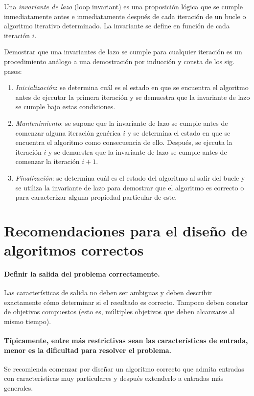 Una \emph{invariante de lazo} (loop invariant) es una proposición lógica que se cumple inmediatamente antes e inmediatamente después de cada iteración de un bucle o algoritmo iterativo determinado. 
La invariante se define en función de cada iteración \(i\).

Demostrar que una invariantes de lazo se cumple para cualquier iteración es un procedimiento análogo a una demostración por inducción y consta de los sig. pasos: 
\begin{enumerate}
  \item \emph{Inicialización}: se determina cuál es el estado en que se encuentra el algoritmo antes de ejecutar la primera iteración y se demuestra que la invariante de lazo se cumple bajo estas condiciones.
  \item \emph{Mantenimiento}: se supone que la invariante de lazo se cumple antes de comenzar alguna iteración genérica \(i\) y se determina el estado en que se encuentra el algoritmo como consecuencia de ello. 
  Después, se ejecuta la iteración \(i\) y se demuestra que la invariante de lazo se cumple antes de comenzar la iteración \(i+1\).
  \item \emph{Finalización}: se determina cuál es el estado del algoritmo al salir del bucle y se utiliza la invariante de lazo para demostrar que el algoritmo es correcto o para caracterizar alguna propiedad particular de este. 
\end{enumerate}

\section{Recomendaciones para el diseño de algoritmos correctos}

\paragraph*{Definir la salida del problema correctamente.}{
  Las características de salida no deben ser ambiguas y deben describir exactamente cómo determinar si el resultado es correcto.
  Tampoco deben constar de objetivos compuestos (esto es, múltiples objetivos que deben alcanzarse al mismo tiempo).
}

\paragraph*{Típicamente, entre más restrictivas sean las características de entrada, menor es la dificultad para resolver el problema.}{
  Se recomienda comenzar por diseñar un algoritmo correcto que admita entradas con características muy particulares y después extenderlo a entradas más generales. 
}

